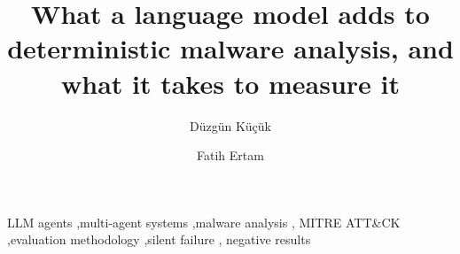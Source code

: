 \documentclass[preprint,11pt,a4paper]{elsarticle}
\begin{document}
\begin{frontmatter}

\title{What a language model adds to deterministic malware analysis, and what it
  takes to measure it}

\author[firat]{D\"uzg\"un K\"u\c{c}\"uk}
\author[firat]{Fatih Ertam}



\begin{abstract}

\end{abstract}

\begin{keyword}
LLM agents \sep multi-agent systems \sep malware analysis \sep
MITRE ATT\&CK \sep evaluation methodology \sep silent failure \sep
negative results
\end{keyword}

\end{frontmatter}












\end{document}
